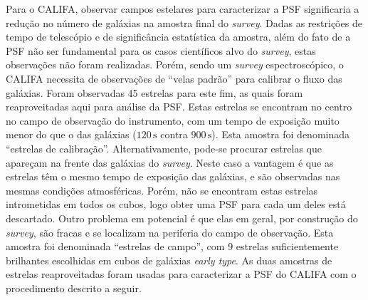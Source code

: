 Para o CALIFA, observar campos estelares para caracterizar a PSF significaria a
redução no número de galáxias na amostra final do {\em survey}. Dadas as
restrições de tempo de telescópio e de significância estatística da amostra,
além do fato de a PSF não ser fundamental para os casos científicos alvo do {\em
survey}, estas observações não foram realizadas. Porém, sendo um {\em survey}
espectroscópico, o CALIFA necessita de observações de ``velas padrão'' para
calibrar o fluxo das galáxias. Foram observadas 45 estrelas para este fim, as
quais foram reaproveitadas aqui para análise da PSF.
Estas estrelas se encontram no centro no campo de observação do instrumento, com
um tempo de exposição muito menor do que o das galáxias ($120\,\mathrm{s}$
contra $900\,\mathrm{s}$). Esta amostra foi denominada ``estrelas de
calibração''. Alternativamente, pode-se procurar estrelas que apareçam na frente
das galáxias do {\em survey}. Neste caso a vantagem é que as estrelas têm o
mesmo tempo de exposição das galáxias, e são observadas nas mesmas condições
atmosféricas. Porém, não se encontram estas estrelas intrometidas em todos os
cubos, logo obter uma PSF para cada um deles está descartado. Outro problema em
potencial é que elas em geral, por construção do {\em survey}, são fracas e se
localizam na periferia do campo de observação. Esta amostra foi denominada
``estrelas de campo'', com 9 estrelas suficientemente brilhantes escolhidas em
cubos de galáxias {\em early type}. As duas amostras de estrelas reaproveitadas
foram usadas para caracterizar a PSF do CALIFA com o procedimento descrito a
seguir.

